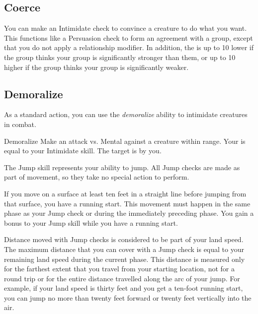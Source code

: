     \subsection{Coerce}
        You can make an Intimidate check to convince a creature to do what you want. This functions like a Persuasion check to form an agreement with a group, except that you do not apply a relationship modifier. In addition, the  is up to 10 lower if the group thinks your group is significantly stronger than them, or up to 10 higher if the group thinks your group is significantly weaker.

    \subsection{Demoralize}\label{Demoralize}

        As a standard action, you can use the \textit{demoralize} ability to intimidate creatures in combat.

        \begin{freeability}{Demoralize}
            Make an attack vs. Mental against a creature within \rngmed range.
            Your  is equal to your Intimidate skill.
            \hit The target is  \shaken by you.
        \end{freeability}

\newpage
{}
    The Jump skill represents your ability to jump.
    All Jump checks are made as part of movement, so they take no special action to perform.

    \label{Running Start} If you move on a surface at least ten feet in a straight line before jumping from that surface, you have a running start.
    This movement must happen in the same phase as your Jump check or during the immediately preceding phase.
    You gain a  bonus to your Jump skill while you have a running start.

    Distance moved with Jump checks is considered to be part of your land speed.
    The maximum distance that you can cover with a Jump check is equal to your remaining land speed during the current phase.
    This distance is measured only for the farthest extent that you travel from your starting location, not for a round trip or for the entire distance travelled along the arc of your jump.
    For example, if your land speed is thirty feet and you get a ten-foot running start, you can jump no more than twenty feet forward or twenty feet vertically into the air.

